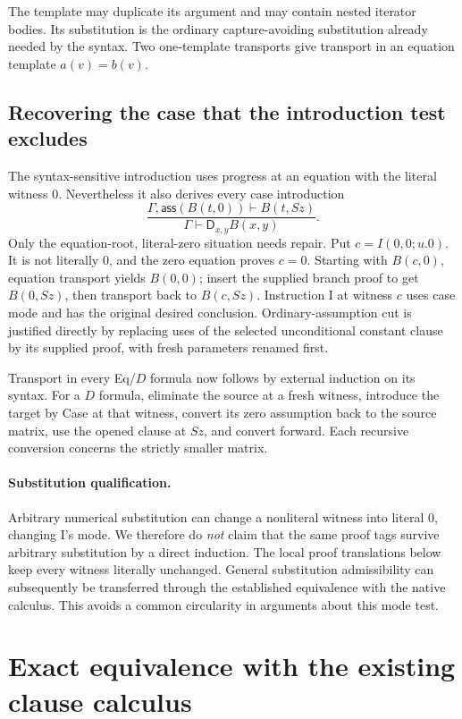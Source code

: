 \documentclass[11pt,letterpaper]{article}
\theoremstyle{definition}\newtheorem{definition}[theorem]{Definition}
\newcommand{\D}{\mathsf D}
\newcommand{\ass}[1]{\mathsf{ass}(#1)}
\begin{document}
The template may duplicate its argument and may contain nested iterator
bodies. Its substitution is the ordinary capture-avoiding substitution
already needed by the syntax. Two one-template transports give transport
in an equation template $a(v)=b(v)$.

\subsection{Recovering the case that the introduction test excludes}

The syntax-sensitive introduction uses progress at an equation with the
literal witness $0$. Nevertheless it also derives every case introduction
\[
 \frac{\Gamma,\ass{B(t,0)}\vdash B(t,Sz)}
      {\Gamma\vdash\D_{x,y}B(x,y)}.                     \tag{Case}
\]
Only the equation-root, literal-zero situation needs repair. Put
$c=I(0,0;u.0)$. It is not literally $0$, and the zero equation proves
$c=0$. Starting with $B(c,0)$, equation transport yields $B(0,0)$;
insert the supplied branch proof to get $B(0,Sz)$, then transport back
to $B(c,Sz)$. Instruction I at witness $c$ uses case mode and has the
original desired conclusion. Ordinary-assumption cut is justified directly
by replacing uses of the selected unconditional constant clause by its
supplied proof, with fresh parameters renamed first.

Transport in every Eq/$D$ formula now follows by external induction on
its syntax. For a $D$ formula, eliminate the source at a fresh witness,
introduce the target by Case at that witness, convert its zero assumption
back to the source matrix, use the opened clause at $Sz$, and convert
forward. Each recursive conversion concerns the strictly smaller matrix.

\paragraph{Substitution qualification.}
Arbitrary numerical substitution can change a nonliteral witness into
literal $0$, changing I's mode. We therefore do \emph{not} claim that the
same proof tags survive arbitrary substitution by a direct induction.
The local proof translations below keep every witness literally unchanged.
General substitution admissibility can subsequently be transferred through
the established equivalence with the native calculus. This avoids a common
circularity in arguments about this mode test.

\section{Exact equivalence with the existing clause calculus}
\label{sec:equivalence}
\end{document}
